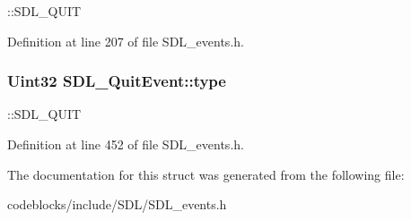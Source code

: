 \+::\+S\+D\+L\+\_\+\+Q\+U\+I\+T 

Definition at line 207 of file S\+D\+L\+\_\+events.\+h.

\hypertarget{structSDL__QuitEvent_a51ab0279e6de40249ba93971a8757cf0}{
\subsubsection[{type}]{\setlength{\rightskip}{0pt plus 5cm}Uint32 S\+D\+L\+\_\+\+Quit\+Event\+::type}}\label{structSDL__QuitEvent_a51ab0279e6de40249ba93971a8757cf0}
\+::\+S\+D\+L\+\_\+\+Q\+U\+I\+T 

Definition at line 452 of file S\+D\+L\+\_\+events.\+h.



The documentation for this struct was generated from the following file\+:\begin{DoxyCompactItemize}
\item 
codeblocks/include/\+S\+D\+L/S\+D\+L\+\_\+events.\+h\end{DoxyCompactItemize}
